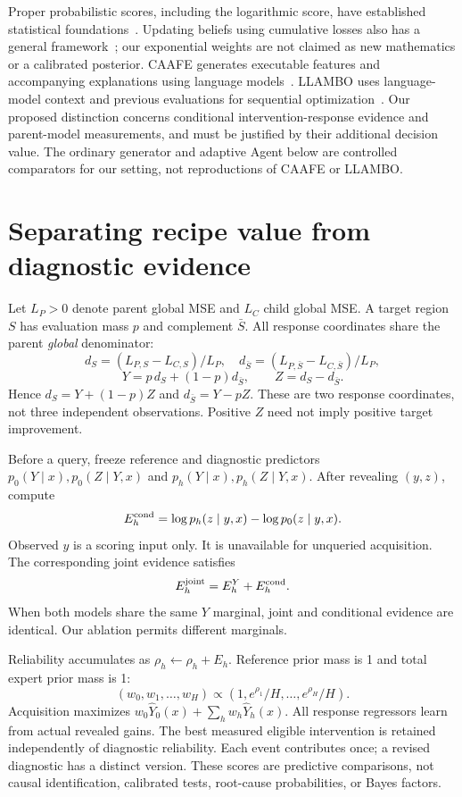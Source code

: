 \documentclass[10pt]{article}
\begin{document}
Proper probabilistic scores, including the logarithmic score, have established statistical foundations~\cite{scoring}.
Updating beliefs using cumulative losses also has a general framework~\cite{generalbayes}; our exponential weights are not claimed as new mathematics or a calibrated posterior.
CAAFE generates executable features and accompanying explanations using language models~\cite{caafe}.
LLAMBO uses language-model context and previous evaluations for sequential optimization~\cite{llambo}.
Our proposed distinction concerns conditional intervention-response evidence and parent-model measurements, and must be justified by their additional decision value.
The ordinary generator and adaptive Agent below are controlled comparators for our setting, not reproductions of CAAFE or LLAMBO.

\section{Separating recipe value from diagnostic evidence}
Let $L_P>0$ denote parent global MSE and $L_C$ child global MSE.
A target region $S$ has evaluation mass $p$ and complement $\bar S$.
All response coordinates share the parent \emph{global} denominator:
\[
 d_S=(L_{P,S}-L_{C,S})/L_P,\quad
 d_{\bar S}=(L_{P,\bar S}-L_{C,\bar S})/L_P,
\]
\[
 Y=p\,d_S+(1-p)d_{\bar S},\qquad Z=d_S-d_{\bar S}.
\]
Hence $d_S=Y+(1-p)Z$ and $d_{\bar S}=Y-pZ$.
These are two response coordinates, not three independent observations.
Positive $Z$ need not imply positive target improvement.

Before a query, freeze reference and diagnostic predictors
$p_0(Y\mid x),p_0(Z\mid Y,x)$ and $p_h(Y\mid x),p_h(Z\mid Y,x)$.
After revealing $(y,z)$, compute
\[
 E_h^{\rm cond}=\log p_h(z\mid y,x)-\log p_0(z\mid y,x).
\]
Observed $y$ is a scoring input only.
It is unavailable for unqueried acquisition.
The corresponding joint evidence satisfies
\[
 E_h^{\rm joint}=E_h^Y+E_h^{\rm cond}.
\]
When both models share the same $Y$ marginal, joint and conditional evidence are identical.
Our ablation permits different marginals.

Reliability accumulates as $\rho_h\leftarrow\rho_h+E_h$.
Reference prior mass is 1 and total expert prior mass is 1:
\[
 (w_0,w_1,\ldots,w_H)\propto
 (1,e^{\rho_1}/H,\ldots,e^{\rho_H}/H).
\]
Acquisition maximizes $w_0\widehat Y_0(x)+\sum_h w_h\widehat Y_h(x)$.
All response regressors learn from actual revealed gains.
The best measured eligible intervention is retained independently of diagnostic reliability.
Each event contributes once; a revised diagnostic has a distinct version.
These scores are predictive comparisons, not causal identification, calibrated tests, root-cause probabilities, or Bayes factors.
\end{document}
